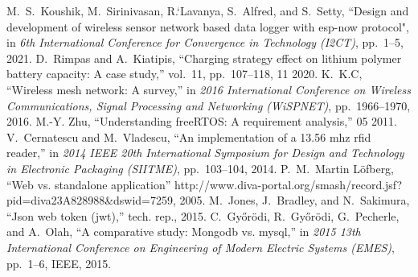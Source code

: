 \documentclass[journal]{IEEEtran}
\begin{document}
\begin{thebibliography}{1}
M.~S.~Koushik, M.~Sirinivasan, R.`Lavanya, S.~Alfred, and S.~Setty, ``Design and development of wireless sensor network based data logger with esp-now protocol", in {\em 6th International Conference for Convergence in Technology (I2CT)}, pp.~1--5, 2021.
D.~Rimpas and A.~Kiatipis, ``Charging strategy effect on lithium polymer battery capacity: A case study,'' vol.~11, pp.~107--118, 11 2020.
K.~K.C, ``Wireless mesh network: A survey,'' in {\em 2016 International
Conference on Wireless Communications, Signal Processing and Networking (WiSPNET)}, pp.~1966--1970, 2016.
M.-Y. Zhu, ``Understanding freeRTOS: A requirement analysis,'' 05 2011.
V.~Cernatescu and M.~Vladescu, ``An implementation of a 13.56 mhz rfid
reader,'' in {\em 2014 IEEE 20th International Symposium for Design and
Technology in Electronic Packaging (SIITME)}, pp.~103--104, 2014.
P.~M.~Martin Löfberg, ``Web vs. standalone application'' http://www.diva-portal.org/smash/record.jsf?pid=diva23A828988\&dswid=7259, 2005.
M.~Jones, J.~Bradley, and N.~Sakimura, ``Json web token (jwt),'' tech. rep., 2015.
C.~Gy{\H{o}}r{\"o}di, R.~Gy{\H{o}}r{\"o}di, G.~Pecherle, and A.~Olah, ``A comparative study: Mongodb vs. mysql,'' in {\em 2015 13th International Conference on Engineering of Modern Electric Systems (EMES)}, pp.~1--6, IEEE, 2015.
\end{thebibliography}
\end{document}
